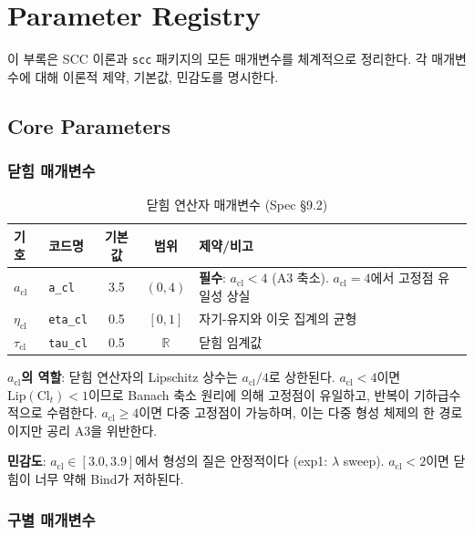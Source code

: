 
\chapter{Parameter Registry}
\label{app:parameters}

이 부록은 SCC 이론과 \texttt{scc} 패키지의 모든 매개변수를 체계적으로 정리한다. 각 매개변수에 대해 이론적 제약, 기본값, 민감도를 명시한다.


\section{Core Parameters}
\label{app:core-params}


\subsection{닫힘 매개변수}

\begin{table}[h]
\centering
\caption{닫힘 연산자 매개변수 (Spec \S9.2)}
\label{tab:closure-params}
\begin{tabular}{llccp{5cm}}
\hline
\textbf{기호} & \textbf{코드명} & \textbf{기본값} & \textbf{범위} & \textbf{제약/비고} \\
\hline
$a_{\mathrm{cl}}$ & \texttt{a\_cl} & 3.5 & $(0, 4)$ & \textbf{필수}: $a_{\mathrm{cl}} < 4$ (A3 축소). $a_{\mathrm{cl}} = 4$에서 고정점 유일성 상실 \\
$\eta_{\mathrm{cl}}$ & \texttt{eta\_cl} & 0.5 & $[0, 1]$ & 자기-유지와 이웃 집계의 균형 \\
$\tau_{\mathrm{cl}}$ & \texttt{tau\_cl} & 0.5 & $\mathbb{R}$ & 닫힘 임계값 \\
\hline
\end{tabular}
\end{table}

\textbf{$a_{\mathrm{cl}}$의 역할}: 닫힘 연산자의 Lipschitz 상수는 $a_{\mathrm{cl}}/4$로 상한된다. $a_{\mathrm{cl}} < 4$이면 $\mathrm{Lip}(\mathrm{Cl}_t) < 1$이므로 Banach 축소 원리에 의해 고정점이 유일하고, 반복이 기하급수적으로 수렴한다. $a_{\mathrm{cl}} \geq 4$이면 다중 고정점이 가능하며, 이는 다중 형성 체제의 한 경로이지만 공리 A3을 위반한다.

\textbf{민감도}: $a_{\mathrm{cl}} \in [3.0, 3.9]$에서 형성의 질은 안정적이다 (exp1: $\lambda$ sweep). $a_{\mathrm{cl}} < 2$이면 닫힘이 너무 약해 Bind가 저하된다.


\subsection{구별 매개변수}

